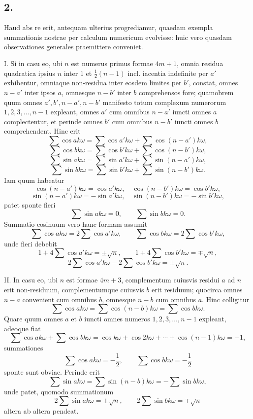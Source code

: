\documentclass[12pt]{article}
\begin{document}
\subsection*{2.}

Haud abs re erit, antequam ulterius progrediamur, quaedam exempla summationis nostrae per calculum numericum evolvisse: huic vero quasdam observationes generales praemittere conveniet.

I. Si in casu eo, ubi $n$ est numerus primus formae $4m+1$, omnia residua quadratica ipsius $n$ inter $1$ et $\frac12(n-1)$ incl. iacentia indefinite per $a'$ exhibentur, omniaque non-residua inter eosdem limites per $b'$, constat, omnes $n-a'$ inter ipsos $a$, omnesque $n-b'$ inter $b$ comprehensos fore; quamobrem quum omnes $a',b',n-a',n-b'$ manifesto totum complexum numerorum $1,2,3,\ldots,n-1$ expleant, omnes $a'$ cum omnibus $n-a'$ iuncti omnes $a$ complectentur, et perinde omnes $b'$ cum omnibus $n-b'$ iuncti omnes $b$ comprehendent. Hinc erit
\[
\sum\cos ak\omega=\sum\cos a'k\omega+\sum\cos(n-a')k\omega,
\]
\[
\sum\cos bk\omega=\sum\cos b'k\omega+\sum\cos(n-b')k\omega,
\]
\[
\sum\sin ak\omega=\sum\sin a'k\omega+\sum\sin(n-a')k\omega,
\]
\[
\sum\sin bk\omega=\sum\sin b'k\omega+\sum\sin(n-b')k\omega.
\]
Iam quum habeatur
\[
\cos(n-a')k\omega=\cos a'k\omega,\quad
\cos(n-b')k\omega=\cos b'k\omega,
\]
\[
\sin(n-a')k\omega=-\sin a'k\omega,\quad
\sin(n-b')k\omega=-\sin b'k\omega,
\]
patet sponte fieri
\[
\sum\sin ak\omega=0,\qquad \sum\sin bk\omega=0.
\]
Summatio cosinuum vero hanc formam assumit
\[
\sum\cos ak\omega=2\sum\cos a'k\omega,\qquad
\sum\cos bk\omega=2\sum\cos b'k\omega,
\]
unde fieri debebit
\[
1+4\sum\cos a'k\omega=\pm\sqrt n,\qquad
1+4\sum\cos b'k\omega=\mp\sqrt n,
\]
\[
2\sum\cos a'k\omega-2\sum\cos b'k\omega=\pm\sqrt n.
\]

II. In casu eo, ubi $n$ est formae $4m+3$, complementum cuiusvis residui $a$ ad $n$ erit non-residuum, complementumque cuiusvis $b$ erit residuum; quocirca omnes $n-a$ convenient cum omnibus $b$, omnesque $n-b$ cum omnibus $a$. Hinc colligitur
\[
\sum\cos ak\omega=\sum\cos(n-b)k\omega=\sum\cos bk\omega.
\]
Quare quum omnes $a$ et $b$ iuncti omnes numeros $1,2,3,\ldots,n-1$ expleant, adeoque fiat
\[
\sum\cos ak\omega+\sum\cos bk\omega
=\cos k\omega+\cos2k\omega+\cdots+\cos(n-1)k\omega=-1,
\]
summationes
\[
\sum\cos ak\omega=-\frac12,\qquad \sum\cos bk\omega=-\frac12
\]
sponte sunt obviae. Perinde erit
\[
\sum\sin ak\omega=\sum\sin(n-b)k\omega=-\sum\sin bk\omega,
\]
unde patet, quomodo summationum
\[
2\sum\sin ak\omega=\pm\sqrt n,\qquad
2\sum\sin bk\omega=\mp\sqrt n
\]
altera ab altera pendeat.
\end{document}
